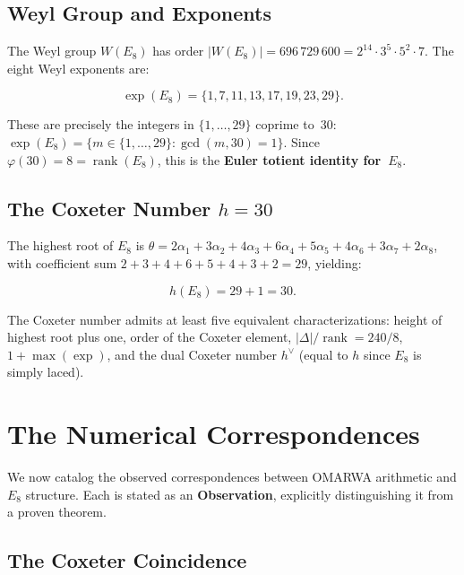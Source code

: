 \documentclass[11pt, a4paper]{article}
\theoremstyle{plain}
\theoremstyle{definition}
\theoremstyle{remark}
\DeclareMathOperator{\rank}{rank}
\begin{document}
\subsection{Weyl Group and Exponents}

The Weyl group $W(E_8)$ has order
$|W(E_8)| = 696\,729\,600 = 2^{14}\cdot 3^5 \cdot 5^2 \cdot 7$.
The eight Weyl exponents are:

\begin{equation}
\label{eq:exponents}
\boxed{\exp(E_8) = \{1, 7, 11, 13, 17, 19, 23, 29\}.}
\end{equation}

These are precisely the integers in $\{1,\ldots,29\}$ coprime to~30:
$\exp(E_8) = \{m \in \{1,\ldots,29\} : \gcd(m, 30) = 1\}$.
Since $\varphi(30) = 8 = \rank(E_8)$, this is the \textbf{Euler
totient identity for~$E_8$}.

\subsection{The Coxeter Number $h = 30$}

The highest root of $E_8$ is
$\theta = 2\alpha_1 + 3\alpha_2 + 4\alpha_3 + 6\alpha_4 + 5\alpha_5 +
4\alpha_6 + 3\alpha_7 + 2\alpha_8$, with coefficient sum
$2+3+4+6+5+4+3+2 = 29$, yielding:

\begin{equation}
\label{eq:coxeter}
h(E_8) = 29 + 1 = 30.
\end{equation}

The Coxeter number admits at least five equivalent characterizations:
height of highest root plus one, order of the Coxeter element,
$|\Delta|/\rank = 240/8$, $1 + \max(\exp)$, and the dual Coxeter
number $h^\vee$ (equal to $h$ since $E_8$ is simply laced).

\section{The Numerical Correspondences}
\label{sec:correspondence}

We now catalog the observed correspondences between OMARWA arithmetic
and $E_8$ structure. Each is stated as an \textbf{Observation},
explicitly distinguishing it from a proven theorem.

\subsection{The Coxeter Coincidence}
\end{document}
